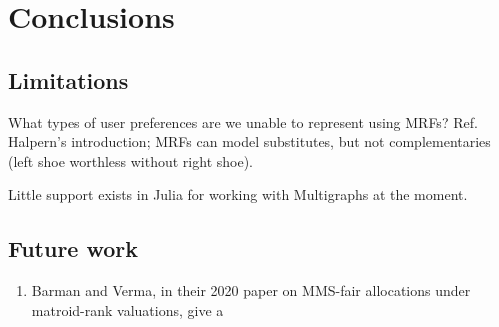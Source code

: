 \chapter{Conclusions}
\label{chap:conclusions}
\section{Limitations}
What types of user preferences are we unable to represent using MRFs? Ref. Halpern's introduction; MRFs can model substitutes, but not complementaries (left shoe worthless without right shoe).

Little support exists in Julia for working with Multigraphs at the moment.

\skelpar
\section{Future work}
\begin{enumerate}
  \item Barman and Verma, in their 2020 paper on MMS-fair allocations under matroid-rank valuations, give a
\end{enumerate}
\skelpar